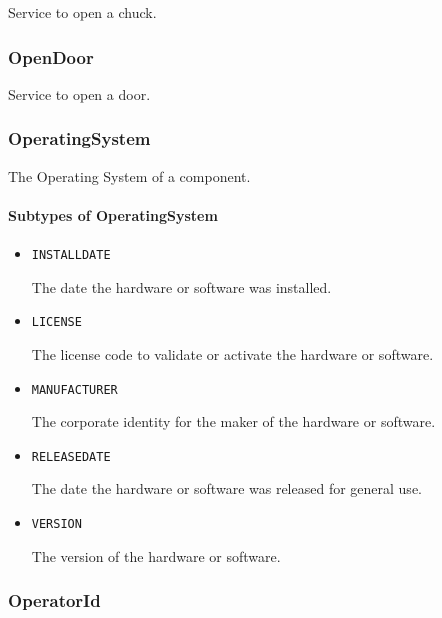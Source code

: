 Service to open a chuck.


\subsubsection{OpenDoor}
\label{sec:OpenDoor}



Service to open a door.


\subsubsection{OperatingSystem}
\label{sec:OperatingSystem}



The Operating System of a component.


\paragraph{Subtypes of OperatingSystem}\mbox{}
\label{sec:Subtypes of OperatingSystem}

\begin{itemize}

\item \texttt{INSTALL\textunderscore DATE}


The date the hardware or software was installed.

\item \texttt{LICENSE}


The license code to validate or activate the hardware or software.

\item \texttt{MANUFACTURER}


The corporate identity for the maker of the hardware or software.


\item \texttt{RELEASE\textunderscore DATE}


The date the hardware or software was released for general use.


\item \texttt{VERSION}


The version of the hardware or software.


\end{itemize}

\subsubsection{OperatorId}
\label{sec:OperatorId}



